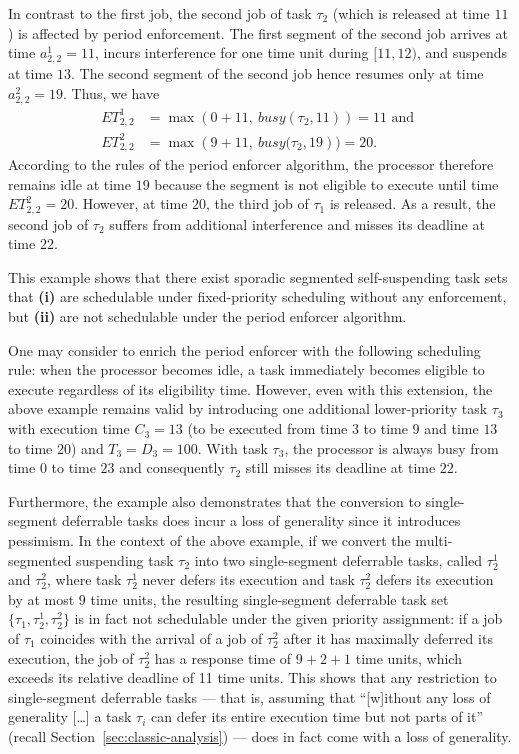 In contrast to the first job, the second job of task $\tau_2$ (which is released at time $11$) is affected by period enforcement. The first segment of the second job arrives at time $a^1_{2,2} = 11$, incurs interference for one time unit during $[11, 12)$, and suspends at time $13$. The  second segment of the second job hence resumes only at time $a^2_{2,2} = 19$. Thus, we have
\begin{align*}
	ET_{2,2}^1 & = \max\left(0 + 11,\ \mathit{busy}(\tau_2, 11)\right) = 11  \text{ and }
\\
	ET_{2,2}^2 & = \max\left(9 + 11,\ \mathit{busy}(\tau_2, 19\right) ) = 20.
\end{align*}
According to the rules of the period enforcer algorithm, the processor therefore remains idle at time $19$ because the segment is not eligible to execute until time $ET_{2,2}^2 = 20$. However, at time $20$, the third job of $\tau_1$ is released. As a result, the second job of $\tau_2$ suffers from additional interference and misses its deadline at time $22$.




This example shows that there exist sporadic segmented self-suspending task sets that   \textbf{(i)} are schedulable under fixed-priority scheduling without any enforcement, but \textbf{(ii)} are not schedulable under the period enforcer algorithm.


One may consider to enrich the period enforcer with the following scheduling rule: when the processor becomes idle, a task immediately becomes eligible to execute regardless of its eligibility time. However, even with this extension, the above example remains valid by introducing one additional lower-priority task $\tau_3$ with execution time $C_3=13$ (to be executed from time $3$ to time $9$ and time $13$ to time $20$) and $T_3=D_3=100$. With task $\tau_3$, the processor is always busy from time $0$ to time $23$ and consequently $\tau_2$ still misses its deadline at time $22$.




Furthermore, the example also demonstrates that the conversion to single-segment deferrable tasks does incur a loss of generality since it introduces pessimism. In the context of the above example, if we convert the multi-segmented suspending task $\tau_2$ into two single-segment deferrable tasks, called $\tau_2^1$ and $\tau_2^2$, where task $\tau_2^1$ never defers its execution and task $\tau_2^2$ defers its execution by at most \emph{$9$} time units, the resulting single-segment deferrable task set $\{\tau_1, \tau_2^1, \tau_2^2\}$ is in fact not schedulable under the given priority assignment: if a job of $\tau_1$ coincides with the arrival of a job of $\tau_2^2$ after it has maximally deferred its execution, the job of $\tau_2^2$ has a response time of $9 + 2 + 1$ time units, which exceeds its relative deadline of 11 time units. This shows that any restriction to single-segment deferrable tasks --- that is, assuming that ``[w]ithout any loss of generality [\ldots] a task $\tau_i$ can defer its entire execution time but not parts of it''~\cite{Raj:suspension1991} (recall Section~\ref{sec:classic-analysis}) --- does in fact come with a loss of generality.




